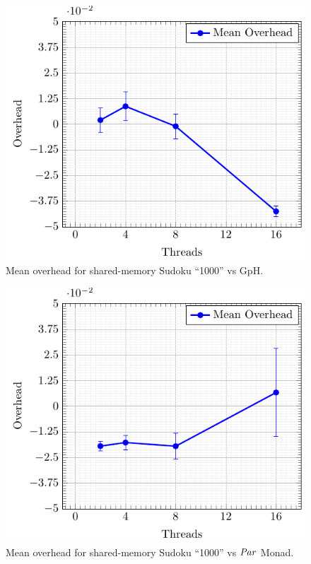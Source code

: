 \documentclass[paper=A4,twoside=true,openright,parskip=full,chapterprefix=true,headings=normal,bibliography=totoc,listof=totoc,titlepage=on,captions=tableabove,draft=false,british]{scrreprt}%
\renewcommand{\enquote}[1]{{``}#1{''}}
\begin{document}
\begin{figure}[h]
\centering
\includegraphics{src/img/overSMSudokuGpH.pdf}
\caption{Mean overhead for shared-memory Sudoku \enquote{1000} vs
GpH.\label{fig:overSMSudokuGpH}}
\end{figure}

\begin{figure}[h]
\centering
\includegraphics{src/img/overSMSudokuPar.pdf}
\caption{Mean overhead for shared-memory Sudoku \enquote{1000} vs \ensuremath{\Conid{Par}}
Monad.\label{fig:overSMSudokuPar}}
\end{figure}
\end{document}
